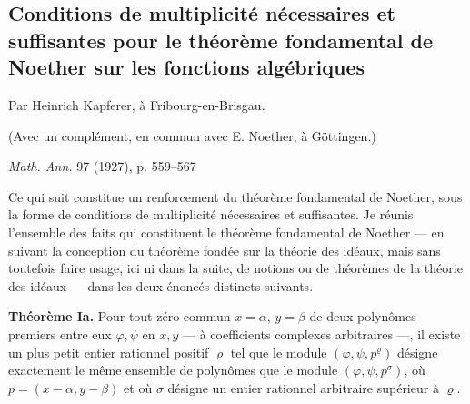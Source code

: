 
\clearpage
\subsection*{Conditions de multiplicité nécessaires et suffisantes pour le théorème fondamental de Noether sur les fonctions algébriques}
\label{fr-r823-conditions-multiplicite-kapferer-noether}

\begin{center}
Par Heinrich Kapferer, à Fribourg-en-Brisgau.

(Avec un complément, en commun avec E. Noether, à Göttingen.)

\emph{Math. Ann.} 97 (1927), p. 559--567
\end{center}

Ce qui suit constitue un renforcement du théorème fondamental de Noether, sous la forme de conditions de multiplicité nécessaires et suffisantes. Je réunis l'ensemble des faits qui constituent le théorème fondamental de Noether --- en suivant la conception du théorème fondée sur la théorie des idéaux, mais sans toutefois faire usage, ici ni dans la suite, de notions ou de théorèmes de la théorie des idéaux --- dans les deux énoncés distincts suivants.

\textbf{Théorème Ia.} Pour tout zéro commun $x=\alpha$, $y=\beta$ de deux polynômes premiers entre eux $\varphi,\psi$ en $x,y$ --- à coefficients complexes arbitraires ---, il existe un plus petit entier rationnel positif $\varrho$ tel que le module $(\varphi,\psi,p^\varrho)$ désigne exactement le même ensemble de polynômes que le module $(\varphi,\psi,p^\sigma)$, où $p=(x-\alpha,y-\beta)$ et où $\sigma$ désigne un entier rationnel arbitraire supérieur à $\varrho$.

